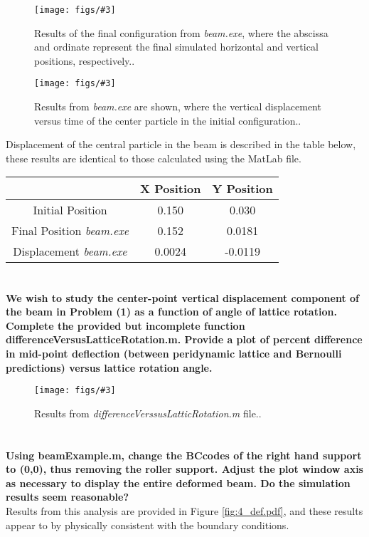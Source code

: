 \documentclass[letterpaper, 10pt, oneside]{article}
\newenvironment{dd}[1]{
	\noindent
	\textbf{\normalsize{#1}}
	\hspace{0.1in}
	\small
	\rmfamily
	}
	{\medskip}
\newcommand{\bdd}{\begin{dd}}
\newcommand{\edd}{\end{dd}}
\newcommand{\Figure}[4]{
  \begin{figure}[#1]
    \centering
    \texttt{[image: figs/\#3]}
    \caption{#4.}\label{fig:#3}
  \end{figure}}
\begin{document}
\Figure{htp}{4}{2_def.pdf}{Results of the final configuration from \emph{beam.exe}, where the abscissa and ordinate represent the final simulated horizontal and vertical positions, respectively.}

\Figure{htp}{4}{2_hist.pdf}{Results from \emph{beam.exe} are shown, where the vertical displacement versus time of the center particle in the initial configuration.}

Displacement of the central particle in the beam is described in the table below, these results are identical to those calculated using the MatLab file.

\begin{center}\begin{tabular}{c c c}
	& X Position & Y Position\\
	\hline
	Initial Position & 0.150 & 0.030 \\
	\hline
	Final Position \emph{beam.exe} & 0.152 & 0.0181 \\
	\hline
	Displacement \emph{beam.exe} & 0.0024 & -0.0119\\
	\hline
\end{tabular}\end{center}
\edd

\section{}
\bdd{We wish to study the center-point vertical displacement component of the beam in Problem (1) as a function of angle of lattice rotation. Complete the provided but incomplete function differenceVersusLatticeRotation.m. Provide a plot of percent difference in mid-point deflection (between peridynamic lattice and Bernoulli predictions) versus lattice rotation angle.}

\Figure{htp}{4}{3_Rot-PerDiff.pdf}{Results from \emph{differenceVerssusLatticRotation.m} file.}
\edd

\section{}
\bdd{Using beamExample.m, change the BCcodes of the right hand support to (0,0), thus removing the roller support. Adjust the plot window axis as necessary to display the entire deformed beam. Do the simulation results seem reasonable?}\\

Results from this analysis are provided in Figure \ref{fig:4_def.pdf}, and these results appear to by physically consistent with the boundary conditions.
\end{document}

